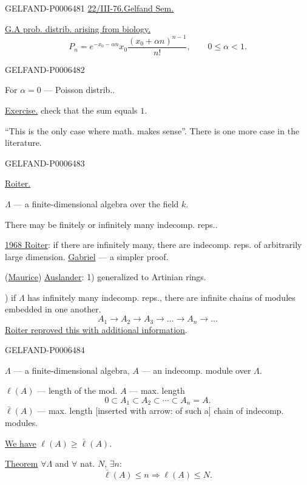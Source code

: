 \begin{GelfandAdjacentEvidence}{GELFAND-P000648}{1}
\underline{22/III-76.}\quad\underline{Gelfand Sem.}

\underline{G.}\quad\underline{A prob. distrib. arising from biology.}
\[
P_n=e^{-x_0-\alpha n}x_0\frac{(x_0+\alpha n)^{n-1}}{n!},
\qquad 0\leqslant\alpha<1.
\]
\end{GelfandAdjacentEvidence}
\begin{GelfandAdjacentEvidence}{GELFAND-P000648}{2}


For \(\alpha=0\) --- Poisson distrib..

\underline{Exercise.} check that the sum equals \(1\).

“This is the only case where math. makes sense”. There is one more case in the literature.
\end{GelfandAdjacentEvidence}
\begin{GelfandAdjacentEvidence}{GELFAND-P000648}{3}


\underline{Roiter.}

\(\Lambda\) --- a finite-dimensional algebra over the field \(k\).

There may be finitely or infinitely many indecomp. reps..

\underline{1968 Roiter}: if there are infinitely many, there are indecomp. reps. of arbitrarily large dimension.
\underline{Gabriel} --- a simpler proof.

(\underline{Maurice}) \underline{Auslander}:
1) generalized to Artinian rings.

) if \(\Lambda\) has infinitely many indecomp. reps., there are infinite chains of modules embedded in one another.
\[
A_1\to A_2\to A_3\to\ldots\to A_n\to\ldots
\]
\underline{Roiter reproved this with additional information}.
\end{GelfandAdjacentEvidence}
\begin{GelfandAdjacentEvidence}{GELFAND-P000648}{4}


\(\Lambda\) --- a finite-dimensional algebra, \(A\) --- an indecomp. module over \(\Lambda\).

\(\ell(A)\) --- length of the mod. \(A\) --- max. length
\[
0\subset A_1\subset A_2\subset\cdots\subset A_n=A.
\]
\(\bar\ell(A)\) --- max. length [inserted with arrow: of such a] chain of indecomp. modules.

\underline{We have} \(\ell(A)\geqslant\bar\ell(A)\).

\underline{Theorem} \(\forall\Lambda\) and \(\forall\) nat. \(N\), \(\exists n\):
\[
\bar\ell(A)\leqslant n\Longrightarrow\ell(A)\leqslant N.
\]
\end{GelfandAdjacentEvidence}
